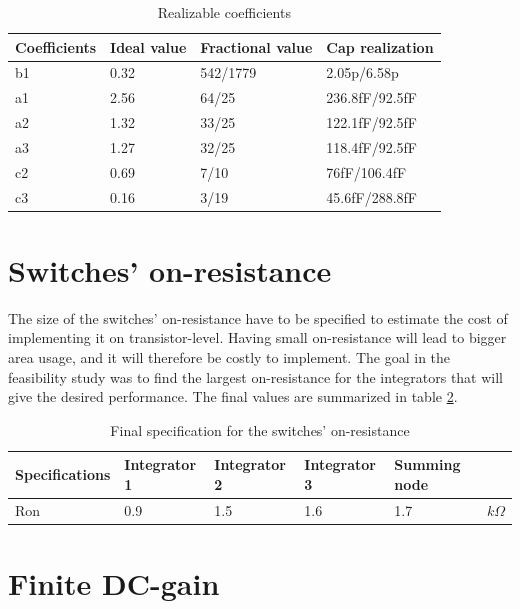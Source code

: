 \begin{table}[h!]
\centering
\caption{Realizable coefficients}
\label{RC}
\begin{tabular}{|l|l|l|l|}
\hline
Coefficients & Ideal value & Fractional value & Cap realization \\ \hline
b1           & 0.32        & 542/1779         & 2.05p/6.58p     \\ \hline
a1           & 2.56        & 64/25            & 236.8fF/92.5fF \\ \hline
a2           & 1.32        & 33/25            & 122.1fF/92.5fF  \\ \hline
a3           & 1.27        & 32/25            & 118.4fF/92.5fF  \\ \hline
c2           & 0.69        & 7/10             & 76fF/106.4fF \\ \hline
c3           & 0.16        & 3/19             & 45.6fF/288.8fF   \\ \hline
\end{tabular}
\end{table}

\section{Switches' on-resistance}\label{on-resistance}
The size of the switches' on-resistance have to be specified to estimate the cost of implementing it on transistor-level. Having small on-resistance will lead to bigger area usage, and it will therefore be costly to implement. The goal in the feasibility study was to find the largest on-resistance for the integrators that will give the desired performance. The final values are summarized in table \ref{spec_res}. 

\begin{table}[H]
\centering
\caption{Final specification for the switches' on-resistance}
\label{spec_res}
\begin{tabular}{|l|l|l|l|l|l|}
\hline
Specifications & Integrator 1 & Integrator 2 & Integrator 3 & Summing node &    \\ \hline
Ron            & 0.9            & 1.5          & 1.6          & 1.7          & $k\Omega$ \\ \hline
\end{tabular}
\end{table}

\section{Finite DC-gain}

